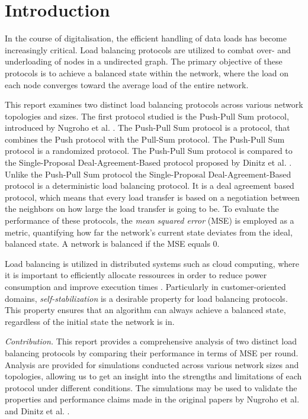 \chapter{Introduction}\label{chap:introduction}
In the course of digitalisation, the efficient handling of data loads has become increasingly critical. Load balancing protocols are utilized to combat over- and underloading of nodes in a undirected graph. The primary objective of these protocols is to achieve a balanced state within the network, where the load on each node converges toward the average load of the entire network. 

This report examines two distinct load balancing protocols across various network topologies and sizes. The first protocol studied is the Push-Pull Sum protocol, introduced by Nugroho et al. \cite{nugroho2023PushPullSumDataAg}. The Push-Pull Sum protocol is a protocol, that combines the Push protocol \cite{kempe2003gossipbasedComp} with the Pull-Sum protocol. The Push-Pull Sum protocol is a randomized protocol. The Push-Pull Sum protocol is compared to the Single-Proposal Deal-Agreement-Based protocol proposed by Dinitz et al. \cite{dinitz2022localDealAgreementloadBalancing}. Unlike the Push-Pull Sum protocol the Single-Proposal Deal-Agreement-Based protocol is a deterministic load balancing protocol. It is a deal agreement based protocol, which means that every load transfer is based on a negotiation between the neighbors on how large the load transfer is going to be. To evaluate the performance of these protocols, the \textit{mean squared error} (MSE) is employed as a metric, quantifying how far the network's current state deviates from the ideal, balanced state. A network is balanced if the MSE equals 0.

Load balancing is utilized in distributed systems such as cloud computing, where it is important to efficiently allocate ressources in order to reduce power consumption and improve execution times \cite{Aghdashi2022NovelDynamicLoadBalancing}. Particularly in customer-oriented domains, \textit{self-stabilization} is a desirable property for load balancing protocols. This property ensures that an algorithm can always achieve a balanced state, regardless of the initial state the network is in.

\textit{Contribution.} This report provides a comprehensive analysis of two distinct load balancing protocols by comparing their performance in terms of MSE per round. Analysis are provided for simulations conducted across various network sizes and topologies, allowing us to get an insight into the strengths and limitations of each protocol under different conditions. The simulations may be used to validate the properties and performance claims made in the original papers by Nugroho et al. \cite{nugroho2023PushPullSumDataAg} and Dinitz et al. \cite{dinitz2022localDealAgreementloadBalancing}.

